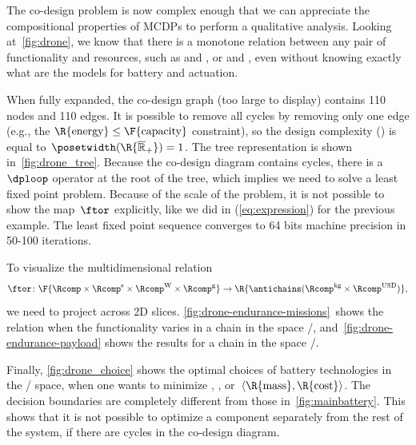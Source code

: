 The co-design problem is now complex enough that we can appreciate
the compositional properties of MCDPs to perform a qualitative analysis.
Looking at~\cref{fig:drone}, we know that there is a monotone relation
between any pair of functionality and resources, such as 
and , or  and , even without knowing
exactly what are the models for battery and actuation.

When fully expanded, the co-design graph (too large to display) contains
110 nodes and 110 edges. It is possible to remove all cycles by removing
only one edge (e.g., the $\R{\text{energy}}\leq\text{\F{\text{capacity}}}$
constraint), so the design complexity ()
is equal to~$\posetwidth(\R{\overline{\mathbb{R}}_{+}})=1$. The
tree representation is shown in~\cref{fig:drone_tree}. Because the
co-design diagram contains cycles, there is a~$\dploop$ operator
at the root of the tree, which implies we need to solve a least fixed
point problem. Because of the scale of the problem, it is not possible
to show the map~$\ftor$ explicitly, like we did in (\ref{eq:expression})
for the previous example. The least fixed point sequence converges
to 64 bits machine precision in 50-100 iterations.

To visualize the multidimensional relation
\[
\ftor\colon\F{\Rcomp\times\Rcomp^{\text{s}}\times\Rcomp^{\text{W}}\times\Rcomp^{\text{g}}}\rightarrow\R{\antichains(\Rcomp^{\text{kg}}\times\Rcomp^{\text{USD}})},
\]
we need to project across 2D slices. \cref{fig:drone-endurance-missions}~shows
the relation when the functionality varies in a chain in the space
/, and~\cref{fig:drone-endurance-payload}
shows the results for a chain in the space /.

Finally, \cref{fig:drone_choice} shows the optimal choices of battery
technologies in the / space, when one
wants to minimize , , or~$\left\langle \R{\text{mass}},\R{\text{cost}}\right\rangle $.
The decision boundaries are completely different from those in~\cref{fig:mainbattery}.
This shows that it is not possible to optimize a component separately
from the rest of the system, if there are cycles in the co-design
diagram.

